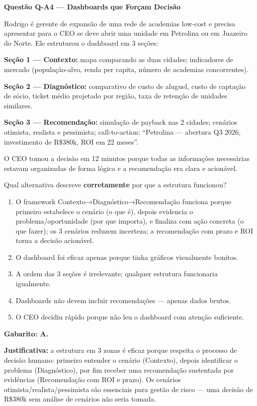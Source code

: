 \begin{SolvedBox}
\textbf{Questão Q-A4 — Dashboards que Forçam Decisão}

Rodrigo é gerente de expansão de uma rede de academias low-cost e precisa apresentar
para o CEO se deve abrir uma unidade em Petrolina ou em Juazeiro do Norte. Ele estruturou
o dashboard em 3 seções:

\textbf{Seção 1 — Contexto:} mapa comparando as duas cidades; indicadores de mercado
(população-alvo, renda per capita, número de academias concorrentes).

\textbf{Seção 2 — Diagnóstico:} comparativo de custo de aluguel, custo de captação de
sócio, ticket médio projetado por região, taxa de retenção de unidades similares.

\textbf{Seção 3 — Recomendação:} simulação de payback nas 2 cidades; cenários otimista,
realista e pessimista; call-to-action: ``Petrolina — abertura Q3 2026, investimento de
R\$380k, ROI em 22 meses''.

O CEO tomou a decisão em 12 minutos porque todas as informações necessárias estavam
organizadas de forma lógica e a recomendação era clara e acionável.

Qual alternativa descreve \textbf{corretamente} por que a estrutura funcionou?

\begin{enumerate}[label=\Alph*)]
  \item O framework Contexto→Diagnóstico→Recomendação funciona porque primeiro estabelece
  o cenário (o que é), depois evidencia o problema/oportunidade (por que importa), e
  finaliza com ação concreta (o que fazer); os 3 cenários reduzem incerteza; a
  recomendação com prazo e ROI torna a decisão acionável.
  \item O dashboard foi eficaz apenas porque tinha gráficos visualmente bonitos.
  \item A ordem das 3 seções é irrelevante; qualquer estrutura funcionaria igualmente.
  \item Dashboards não devem incluir recomendações — apenas dados brutos.
  \item O CEO decidiu rápido porque não leu o dashboard com atenção suficiente.
\end{enumerate}

\textbf{Gabarito: A.}

\textbf{Justificativa:} a estrutura em 3 zonas é eficaz porque respeita o processo de
decisão humano: primeiro entender o cenário (Contexto), depois identificar o problema
(Diagnóstico), por fim receber uma recomendação sustentada por evidências (Recomendação
com ROI e prazo). Os cenários otimista/realista/pessimista são essenciais para gestão
de risco — uma decisão de R\$380k sem análise de cenários não seria tomada.
\end{SolvedBox}

